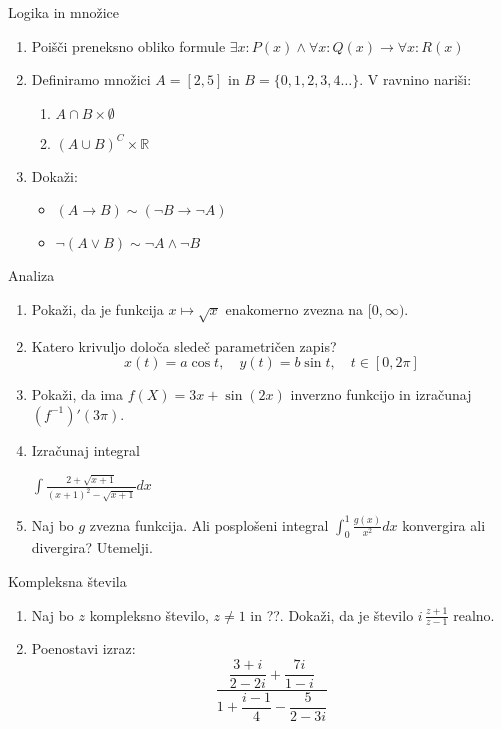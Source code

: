 \begin{frame}{Logika in množice}
	\begin{enumerate}
		\item
		Poišči preneksno obliko formule 
		$ \exists{x} : P(x) \land \forall{x} : Q(x) \rightarrow \forall{x} : R(x) $
		\item 
		Definiramo množici $A= [2,5]$ in $B= \{0,1,2,3,4\dots\}$.
		V ravnino nariši:
		\begin{enumerate}
		   \item $A \cap B \times \emptyset $
		   \item $ (A \cup B)^C \times \mathbb{R} $
		\end{enumerate}
		\item
		Dokaži:
		\begin{itemize}
			\item $(A \rightarrow B) \sim (\lnot B \rightarrow \lnot A)$
			\item $\lnot(A \lor B) \sim \lnot A \land \lnot B$
		\end{itemize}
	\end{enumerate}
\end{frame}

\begin{frame}{Analiza}
	\begin{enumerate}
		\item
		Pokaži, da je funkcija $x \mapsto \sqrt{x}$ enakomerno zvezna na $[0,\infty)$.
		\item 
		Katero krivuljo določa sledeč parametričen zapis?
		$$
		   x(t) = a \cos t, \quad %
		   y(t) = b \sin t, \quad %
		   t \in [0, 2 \pi]
		$$ 
		\item
		Pokaži, da ima $f(X) = 3x + \sin(2x)$ inverzno funkcijo in izračunaj $(f^{-1})'(3\pi)$.
		
		\item
		Izračunaj integral 
		
		$ \displaystyle{ \int \frac{2+\sqrt{x+1}}{(x+1)^2-\sqrt{x+1}} dx }$
		\item 
		Naj bo $g$ zvezna funkcija. Ali posplošeni integral 
		$ \int_{0}^{1} \frac{g(x)}{x^2} dx $
		konvergira ali divergira? Utemelji.
	\end{enumerate}
\end{frame}

\begin{frame}{Kompleksna števila}
	\begin{enumerate}
		\item
		Naj bo $z$ kompleksno število, $z \ne 1$ in ??.
		Dokaži, da je število \( i \, \frac{z+1}{z-1} \) realno.
		\item
		Poenostavi izraz:
		$$ \dfrac{\dfrac{3+i}{2-2i}+\dfrac{7i}{1-i}}{1+\dfrac{i-1}{4}-\dfrac{5}{2-3i}} $$
	\end{enumerate}
\end{frame}